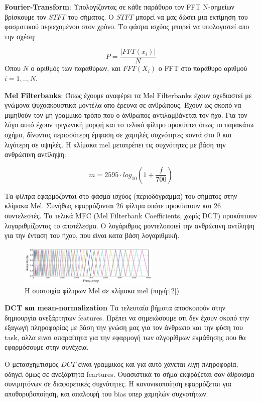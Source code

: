 \documentclass[12pt]{article}
\begin{document}
\textbf{Fourier-Transform}: Υπολογίζοντας σε κάθε  παράθυρο τον FFT N-σημείων βρίσκουμε τον $STFT$ του σήματος. Ο $STFT$ μπορεί να μας δώσει μια εκτίμηση του φασματικού περιεχομένου στον χρόνο. Το φάσμα ισχύος μπορεί να υπολογιστεί απο την σχέση: 

$$P = \frac{|FFT(x_i)|}{N}$$ 
Όπου $N$ ο αριθμός των παραθύρων, και $FFT(X_i)$ ο FFT στο παράθυρο αριθμού $i=1,..,N$.  

\textbf{Mel Filterbanks}: Όπως έχουμε αναφέρει τα Mel Filterbanks έχουν σχεδιαστεί με γνώμονα ψυχοακουστικά μοντέλα απο έρευνα σε ανθρώπους. Έχουν ως σκοπό να μιμηθούν τον μή γραμμικό τρόπο που ο άνθρωπος αντιλαμβάνεται τον ήχο. Για τον λόγο αυτό έχουν τριγωνική μορφή και το τελικό φίλτρο προκύπτει όπως το παρακάτω σχήμα, δίνοντας περισσότερη έμφαση σε χαμηλές συχνότητες κοντά στο $0$ και λιγότερη σε υψηλές. Η κλίμακα mel μετατρέπει τις συχνότητες με βάση την ανθρώπινη αντίληψη:

$$m=2595\cdot log_{10}(1+\frac{f}{700})$$

Τα φίλτρα εφαρμόζονται στο φάσμα ισχύος (περιοδόγραμμα) του σήματος στην κλίμακα Mel. Συνήθως εφαρμόζονται 26 φίλτρα οπότε προκύπτουν και 26 συντελεστές. Τα τελικά MFC (Mel Filterbank Coefficients, χωρίς DCT) προκύπτουν λογαριθμίζοντας το αποτέλεσμα. Ο λογάριθμος μοντελοποιεί την ανθρώπινη αντίληψη για την ένταση του ήχου, που είναι κατα βάση λογαριθμική. 

\begin{figure}[h]
\caption{Η συστοιχία φίλτρων Mel σε κλίμακα mel (πηγή:[2])}
\centering
\includegraphics[width=0.6\textwidth]{mel_filters}
\end{figure}


\textbf{DCT και mean-normalization} Τα τελευταία βήματα αποσκοπούν στην δημιουργία ανεξάρτητων features. Πρέπει να σημειώσουμε οτι δεν έχουν σκοπό την εξαγωγή πληροφορίας με βάση την γνώση μας για τον άνθρωπο και την φύση του task, αλλα ειναι απαραίτητα για την εφαρμογή των αλγορίθμων εκμάθησης που θα εφαρμόσουμε στην συνέχεια. 

Ο μετασχημτισμός $DCT$ είναι γραμμικος και για αυτό χάνεται λίγη πληροφορία, οδηγεί όμως σε ανεξάρτητα feartures. Ουασιστικά το σήμα εκφράζεται σαν άθροισμα συνιμητόνων σε διαφορετικές συχνότητες. Η κανονικοποίηση εφαρμόζεται για αποθορυβοποίηση, και απαλοιφή του bias υπερ χαμηλών συχνοτήτων. 
\end{document}
